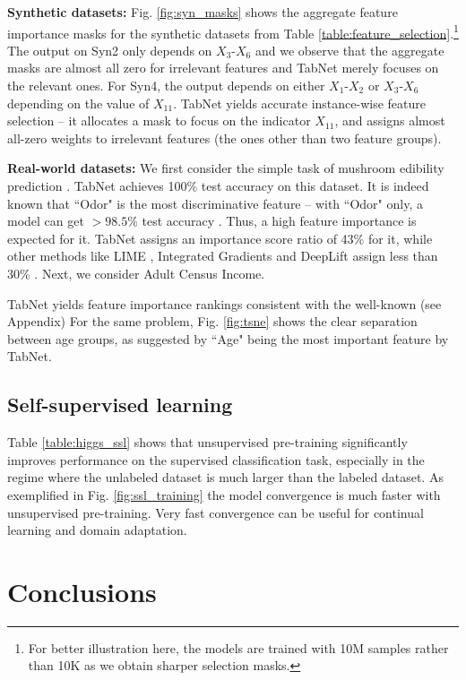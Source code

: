 {\bf Synthetic datasets:} Fig. \ref{fig:syn_masks} shows the aggregate feature importance masks for the synthetic datasets from Table \ref{table:feature_selection}.\footnote{For better illustration here, the models are trained with 10M samples rather than 10K as we obtain sharper selection masks.} The output on Syn2 only depends on $X_3$-$X_6$ and we observe that the aggregate masks are almost all zero for irrelevant features and TabNet merely focuses on the relevant ones. For Syn4, the output depends on either $X_1$-$X_2$ or $X_3$-$X_6$ depending on the value of $X_{11}$. TabNet yields accurate instance-wise feature selection -- it allocates a mask to focus on the indicator $X_{11}$, and assigns almost all-zero weights to irrelevant features (the ones other than two feature groups).

{\bf Real-world datasets:} We first consider the simple task of mushroom edibility prediction \citep{UCI}. TabNet achieves 100\% test accuracy on this dataset. It is indeed known \citep{UCI} that ``Odor" is the most discriminative feature -- with ``Odor" only, a model can get $>98.5 \%$ test accuracy \citep{UCI}. Thus, a high feature importance is expected for it. TabNet assigns an importance score ratio of 43\% for it, while other methods like LIME \citep{lime}, Integrated Gradients \citep{integrated_gradients} and DeepLift \citep{deeplift} assign less than 30\% \citep{global_explanations}. Next, we consider Adult Census Income.

TabNet yields feature importance rankings consistent with the well-known \citep{shap, nbviewer} (see Appendix) For the same problem, Fig. \ref{fig:tsne} shows the clear separation between age groups, as suggested by ``Age" being the most important feature by TabNet. 

\subsection{Self-supervised learning}

Table \ref{table:higgs_ssl} shows that unsupervised pre-training significantly improves performance on the supervised classification task, especially in the regime where the unlabeled dataset is much larger than the labeled dataset. As exemplified in Fig. \ref{fig:ssl_training} the model convergence is much faster with unsupervised pre-training. Very fast convergence can be useful for continual learning and domain adaptation.

\section{Conclusions}

